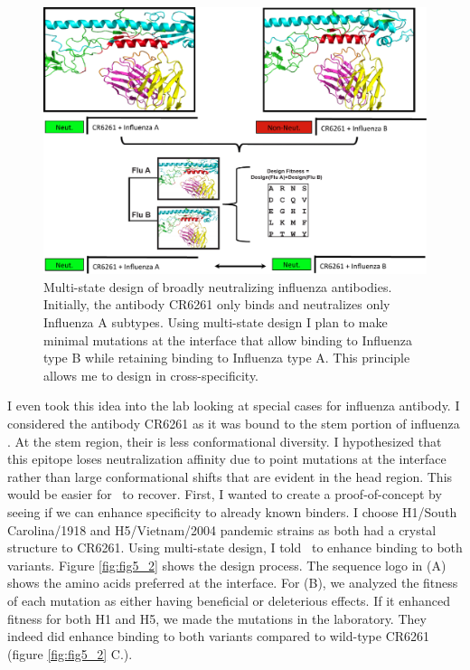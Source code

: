 \begin{figure}[!t]
   \centering
   \includegraphics[width=.9\textwidth]{images/chapter5/figure5_1.pdf}
   \caption[Multi-State Design of Broadly Neutralizing Influenza Antibodies]{Multi-state design of broadly neutralizing influenza antibodies. Initially, the antibody CR6261 only binds and neutralizes only Influenza A subtypes. Using multi-state design I plan to make minimal mutations at the interface that allow binding to Influenza type B while retaining binding to Influenza type A. This principle allows me to design in cross-specificity.}
       \label{fig:fig5_1}
\end{figure}


I even took this idea into the lab looking at special cases for influenza antibody. I considered the antibody CR6261 as it was bound to the stem portion of influenza \citep{Corti:2011ku}. At the stem region, their is less conformational diversity. I hypothesized that this epitope loses neutralization affinity due to point mutations at the interface rather than large conformational shifts that are evident in the head region. This would be easier for \rosettadesign~to recover. First, I wanted to create a proof-of-concept by seeing if we can enhance specificity to already known binders. I choose H1/South Carolina/1918 and H5/Vietnam/2004 pandemic strains as both had a crystal structure to CR6261. Using multi-state design, I told \rosettadesign~to enhance binding to both variants. Figure \ref{fig:fig5_2} shows the design process. The sequence logo in (A) shows the amino acids preferred at the interface. For (B), we analyzed the fitness of each mutation as either having beneficial or deleterious effects. If it enhanced fitness for both H1 and H5, we made the mutations in the laboratory. They indeed did enhance binding to both variants compared to wild-type CR6261 (figure \ref{fig:fig5_2} C.).

